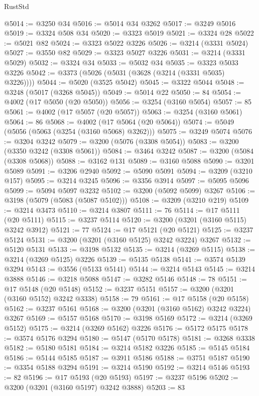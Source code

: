 \begin{lexlean}{RustStd}
\begin{coremodule}
{\begin{coremodule}
{{{{{{{{{{{{{{{{{{{{{{{{{@5014 := @3250 @34
@5016 := @5014 @34 @3262
@5017 := @3249 @5016
@5019 := @3324 @508 @34
@5020 := @3323 @5019
@5021 := @3324 @28
@5022 := @5021 @82
@5024 := @3323 @5022 @3226
@5026 := @3214 (@3331 @5024)
@5027 := @3550 @82
@5029 := @3323 @5027 @3226
@5031 := @3214 (@3331 @5029)
@5032 := @3324 @34
@5033 := @5032 @34
@5035 := @3323 @5033 @3226
@5042 := @3373 (@5026 (@5031 (@3628 (@3214 (@3331 @5035) @3226))))
@5044 := @5020 (@3525 @5042)
@5045 := @3322 @5044
@5048 := @3248 (@5017 (@3268 @5045))
@5049 := @5014 @22
@5050 := 84
@5054 := @4002 (@17 @5050 (@20 @5050))
@5056 := @3254 (@3160 @5054)
@5057 := 85
@5061 := @4002 (@17 @5057 (@20 @5057))
@5063 := @3254 (@3160 @5061)
@5064 := 86
@5068 := @4002 (@17 @5064 (@20 @5064))
@5074 := @5049 (@5056 (@5063 (@3254 (@3160 @5068) @3262)))
@5075 := @3249 @5074
@5076 := @3204 @3242
@5079 := @3200 (@5076 (@3308 @5054))
@5083 := @3200 (@3350 @3242 (@3308 @5061))
@5084 := @3464 @3242
@5087 := @3200 (@5084 (@3308 @5068))
@5088 := @3162 @131
@5089 := @3160 @5088
@5090 := @3201 @5089
@5091 := @3206 @2940
@5092 := @5090 @5091
@5094 := @3209 (@3210 @157)
@5095 := @3214 @3245
@5096 := @3356 @3914
@5097 := @5095 @5096
@5099 := @5094 @5097 @3232
@5102 := @3200 (@5092 @5099) @3267
@5106 := @3198 (@5079 (@5083 (@5087 @5102)))
@5108 := @3209 (@3210 @219)
@5109 := @3214 @3473
@5110 := @3214 @3807
@5111 := 76
@5114 := @17 @5111 (@20 @5111)
@5115 := @3237 @5114
@5120 := @3200 (@3201 (@3160 @5115) @3242 @3912)
@5121 := 77
@5124 := @17 @5121 (@20 @5121)
@5125 := @3237 @5124
@5131 := @3200 (@3201 (@3160 @5125) @3242 @3224) @3267
@5132 := @5120 @5131
@5133 := @3198 @5132
@5135 := @3214 (@3269 @5115)
@5138 := @3214 (@3269 @5125) @3226
@5139 := @5135 @5138
@5141 := @3574 @5139 @3294
@5143 := @3556 (@5133 @5141)
@5144 := @3214 @5143
@5145 := @3214 @3888
@5146 := @3218 @5088
@5147 := @3282 @5146
@5148 := 78
@5151 := @17 @5148 (@20 @5148)
@5152 := @3237 @5151
@5157 := @3200 (@3201 (@3160 @5152) @3242 @3338)
@5158 := 79
@5161 := @17 @5158 (@20 @5158)
@5162 := @3237 @5161
@5168 := @3200 (@3201 (@3160 @5162) @3242 @3224) @3267
@5169 := @5157 @5168
@5170 := @3198 @5169
@5172 := @3214 (@3269 @5152)
@5175 := @3214 (@3269 @5162) @3226
@5176 := @5172 @5175
@5178 := @3574 @5176 @3294
@5180 := @5147 (@5170 @5178)
@5181 := @3268 @3338
@5182 := @5180 @5181
@5184 := @3214 @5182 @3226
@5185 := @5145 @5184
@5186 := @5144 @5185
@5187 := @3911 @5186
@5188 := @3751 @5187
@5190 := @3354 @5188 @3294
@5191 := @3214 @5190
@5192 := @3214 @5146
@5193 := 82
@5196 := @17 @5193 (@20 @5193)
@5197 := @3237 @5196
@5202 := @3200 (@3201 (@3160 @5197) @3242 @3888)
@5203 := 83
}}}}}}}}}}}}}}}}}}}}}}}}}
\end{coremodule}}
\end{coremodule}
\end{lexlean}
